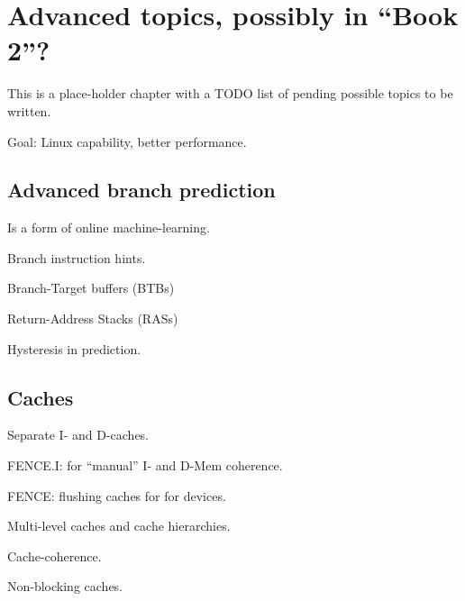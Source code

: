 

\chapter{Advanced topics, possibly in ``Book 2''?}


\setcounter{page}{1}
\renewcommand{\thepage}{\arabic{chapter}-\arabic{page}}

\label{ch_Pending}


This is a place-holder chapter with a TODO list of pending possible
topics to be written.

Goal: Linux capability, better performance.

\hdivider


\section{Advanced branch prediction}

Is a form of online machine-learning.

Branch instruction hints.

Branch-Target buffers (BTBs)

Return-Address Stacks (RASs)

Hysteresis in prediction.


\section{Caches}

Separate I- and D-caches.

FENCE.I: for ``manual'' I- and D-Mem coherence.

FENCE: flushing caches for for devices.

Multi-level caches and cache hierarchies.

Cache-coherence.

Non-blocking caches.



